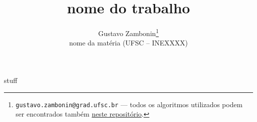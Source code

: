 \documentclass{article}
\title{\textbf{nome do trabalho}}
\author{Gustavo Zambonin\thanks{\texttt{gustavo.zambonin@grad.ufsc.br} ---
todos os algoritmos utilizados podem ser encontrados
também \href{https://github.com/zambonin/ufsc-inexxxx}{neste repositório}.} \\
\small {nome da matéria (UFSC -- INEXXXX)} \vspace{-5mm}}
\date{}
\begin{document}
\maketitle

stuff
\end{document}
